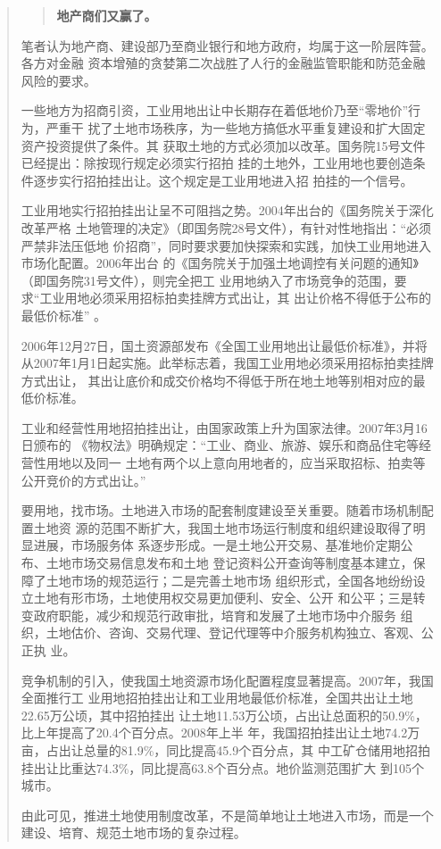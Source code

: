 \begin{quotation}
\begin{quotation}
  \textbf{地产商们又赢了。}\cite{2011feiteng}
\end{quotation}
笔者认为地产商、建设部乃至商业银行和地方政府，均属于这一阶层阵营。各方对金融
资本增殖的贪婪第二次战胜了人行的金融监管职能和防范金融风险的要求。


一些地方为招商引资，工业用地出让中长期存在着低地价乃至“零地价”行为，严重干
扰了土地市场秩序，为一些地方搞低水平重复建设和扩大固定资产投资提供了条件。其
获取土地的方式必须加以改革。国务院15号文件已经提出：除按现行规定必须实行招拍
挂的土地外，工业用地也要创造条件逐步实行招拍挂出让。这个规定是工业用地进入招
拍挂的一个信号。

  工业用地实行招拍挂出让呈不可阻挡之势。2004年出台的《国务院关于深化改革严格
  土地管理的决定》（即国务院28号文件），有针对性地指出：“必须严禁非法压低地
  价招商”，同时要求要加快探索和实践，加快工业用地进入市场化配置。2006年出台
  的《国务院关于加强土地调控有关问题的通知》（即国务院31号文件），则完全把工
  业用地纳入了市场竞争的范围，要求“工业用地必须采用招标拍卖挂牌方式出让，其
  出让价格不得低于公布的最低价标准” 。

  2006年12月27日，国土资源部发布《全国工业用地出让最低价标准》，并将
  从2007年1月1日起实施。此举标志着，我国工业用地必须采用招标拍卖挂牌方式出让，
  其出让底价和成交价格均不得低于所在地土地等别相对应的最低价标准。

  工业和经营性用地招拍挂出让，由国家政策上升为国家法律。2007年3月16日颁布的
  《物权法》明确规定：“工业、商业、旅游、娱乐和商品住宅等经营性用地以及同一
  土地有两个以上意向用地者的，应当采取招标、拍卖等公开竞价的方式出让。”

  要用地，找市场。土地进入市场的配套制度建设至关重要。随着市场机制配置土地资
  源的范围不断扩大，我国土地市场运行制度和组织建设取得了明显进展，市场服务体
  系逐步形成。一是土地公开交易、基准地价定期公布、土地市场交易信息发布和土地
  登记资料公开查询等制度基本建立，保障了土地市场的规范运行；二是完善土地市场
  组织形式，全国各地纷纷设立土地有形市场，土地使用权交易更加便利、安全、公开
  和公平；三是转变政府职能，减少和规范行政审批，培育和发展了土地市场中介服务
  组织，土地估价、咨询、交易代理、登记代理等中介服务机构独立、客观、公正执
  业。

  竞争机制的引入，使我国土地资源市场化配置程度显著提高。2007年，我国全面推行工
  业用地招拍挂出让和工业用地最低价标准，全国共出让土地22.65万公顷，其中招拍挂出
  让土地11.53万公顷，占出让总面积的50.9\%，比上年提高了20.4个百分点。2008年上半
  年，我国招拍挂出让土地74.2万亩，占出让总量的81.9\%，同比提高45.9个百分点，其
  中工矿仓储用地招拍挂出让比重达74.3\%，同比提高63.8个百分点。地价监测范围扩大
  到105个城市。

  由此可见，推进土地使用制度改革，不是简单地让土地进入市场，而是一个建设、培育、规范土地市场的复杂过程。
\end{quotation}

